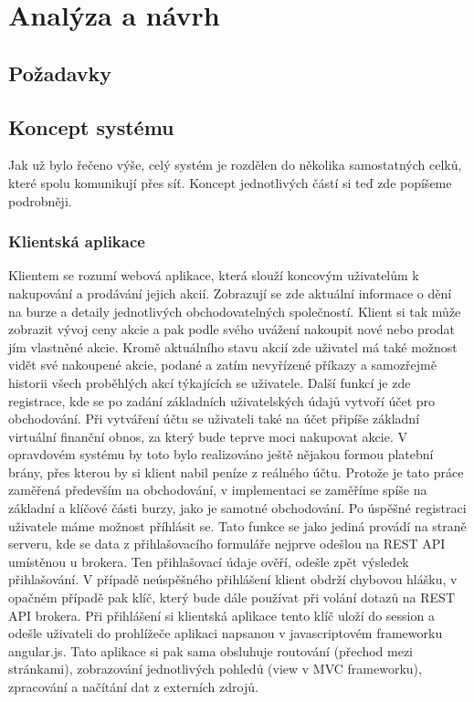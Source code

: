 \documentclass[thesis=M,czech]{FITthesis}[2012/06/26]
\begin{document}
\chapter{Analýza a návrh}

\section{Požadavky}
\section{Koncept systému}
Jak už bylo řečeno výše, celý systém je rozdělen do několika samostatných celků, které spolu komunikují přes síť. Koncept jednotlivých částí si teď zde popíšeme podrobněji.


\subsection{Klientská aplikace}
Klientem se rozumí webová aplikace, která slouží koncovým uživatelům k nakupování a prodávání jejich akcií. Zobrazují se zde aktuální informace o dění na burze a detaily jednotlivých obchodovatelných společností. Klient si tak může zobrazit vývoj ceny akcie a pak podle svého uvážení nakoupit nové nebo prodat jím vlastněné akcie. Kromě aktuálního stavu akcií zde uživatel má také možnost vidět své nakoupené akcie, podané a zatím nevyřízené příkazy a samozřejmě historii všech proběhlých akcí týkajících se uživatele.
Další funkcí je zde registrace, kde se po zadání základních uživatelských údajů vytvoří účet pro obchodování. Při vytváření účtu se uživateli také na účet připíše základní virtuální finanční obnos, za který bude teprve moci nakupovat akcie. V opravdovém systému by toto bylo realizováno ještě nějakou formou platební brány, přes kterou by si klient nabil peníze z reálného účtu. Protože je tato práce zaměřená především na obchodování, v implementaci se zaměříme spíše na základní a klíčové části burzy, jako je samotné obchodování.
    Po úspěšné registraci uživatele máme možnost příhlásit se. Tato funkce se jako jediná provádí na straně serveru, kde se data z přihlašovacího formuláře nejprve odešlou na REST API umístěnou u brokera. Ten přihlašovací údaje ověří, odešle zpět výsledek přihlašování. V případě neúspěšného přihlášení klient obdrží chybovou hlášku, v opačném případě pak klíč, který bude dále používat při volání dotazů na REST API brokera. Při přihlášení si klientská aplikace tento klíč uloží do session a odešle uživateli do prohlížeče aplikaci napsanou v javascriptovém frameworku angular.js. Tato aplikace si pak sama obsluhuje routování (přechod mezi stránkami), zobrazování jednotlivých pohledů (view v MVC frameworku), zpracování a načítání dat z externích zdrojů.
\end{document}
